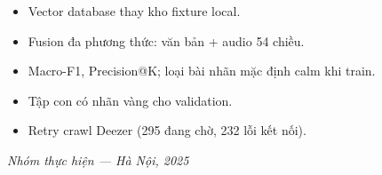 \begin{itemize}
  \item Vector database thay kho fixture local.
  \item Fusion đa phương thức: văn bản + audio 54 chiều.
  \item Macro-F1, Precision@K; loại bài nhãn mặc định calm khi train.
  \item Tập con có nhãn vàng cho validation.
  \item Retry crawl Deezer (295 đang chờ, 232 lỗi kết nối).
\end{itemize}

\vspace{1em}
\begin{flushright}
  \textit{Nhóm thực hiện --- Hà Nội, 2025}
\end{flushright}
